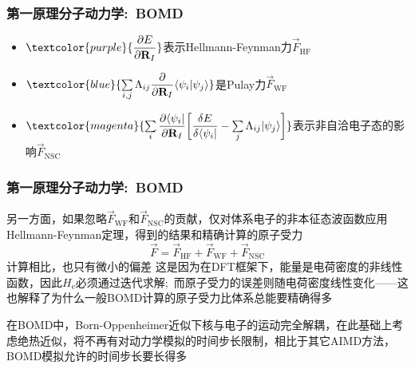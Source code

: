 \frame
{
	\frametitle{第一原理分子动力学:~\textrm{BOMD}}
	\begin{itemize}
		\item $\textcolor{purple}{\dfrac{\partial E}{\partial\mathbf{R}_I}}$表示\textrm{Hellmann-Feynman}力$\vec F_{\mathrm{HF}}$
		\item $\textcolor{blue}{\sum\limits_{i,j}\Lambda_{ij}\dfrac{\partial}{\partial \mathbf{R}_I}\langle\psi_i|\psi_j\rangle}$是\textrm{Pulay}力$\vec F_{\mathrm{WF}}$\\
			{\fontsize{6.2pt}{4.2pt}}
		\item $\textcolor{magenta}{\sum\limits_i\dfrac{\partial\langle\psi_i|}{\partial\mathbf{R}_I}\bigg[\dfrac{\delta E}{\delta\langle\psi_i|}-\sum\limits_j\Lambda_{ij}|\psi_j\rangle\bigg]}$表示非自洽电子态的影响$\vec F_{\mathrm{NSC}}$\\
			{\fontsize{6.2pt}{4.2pt}}
	\end{itemize}
}

\frame
{
	\frametitle{第一原理分子动力学:~\textrm{BOMD}}
	另一方面，如果忽略$\vec F_{\mathrm{WF}}$和$\vec F_{\mathrm{NSC}}$的贡献，仅对体系电子的非本征态波函数应用\textrm{Hellmann-Feynman}定理，得到的结果和精确计算的原子受力
	\begin{displaymath}
		\vec F=\vec F_{\mathrm{HF}}+\vec F_{\mathrm{WF}}+\vec F_{\mathrm{NSC}}
	\end{displaymath}
	计算相比，也只有微小的偏差
	\vskip 1.5pt
	这是因为在\textrm{DFT}框架下，能量是电荷密度的非线性函数，因此$H_{\mathrm{e}}$必须通过迭代求解;~而原子受力的误差则随电荷密度线性变化——这也解释了为什么一般\textrm{BOMD}计算的原子受力比体系总能要精确得多

	\vskip 5pt
	在\textrm{BOMD}中，\textrm{Born-Oppenheimer}近似下核与电子的运动完全解耦，在此基础上考虑绝热近似，将不再有对动力学模拟的时间步长限制，相比于其它\textrm{AIMD}方法，\textrm{BOMD}模拟允许的时间步长要长得多
}

